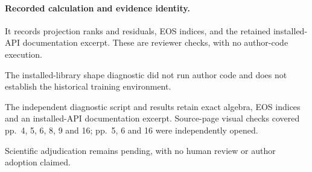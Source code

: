 \documentclass[10pt]{article}
\begin{document}
\paragraph*{Recorded calculation and evidence identity.}\mbox{}\par
It records projection ranks and residuals, EOS indices, and the retained installed-API documentation excerpt. These are reviewer checks, with no author-code execution.\par
The installed-library shape diagnostic did not run author code and does not establish the historical training environment.\par
The independent diagnostic script and results retain exact algebra, EOS indices and an installed-API documentation excerpt. Source-page visual checks covered pp. 4, 5, 6, 8, 9 and 16; pp. 5, 6 and 16 were independently opened.\par
Scientific adjudication remains pending, with no human review or author adoption claimed.\par
\end{document}
